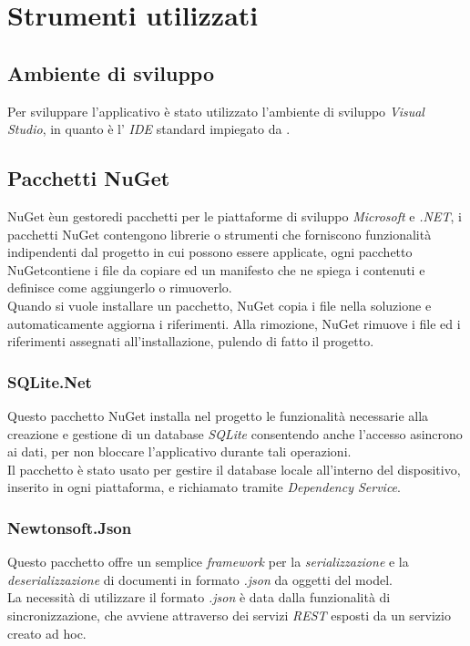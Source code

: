 \section{Strumenti utilizzati}
\subsection{Ambiente di sviluppo}
Per sviluppare l'applicativo è stato utilizzato l'ambiente di sviluppo \textit{Visual Studio}, in quanto è l' \textit{IDE} standard impiegato da \asi.

\subsection{Pacchetti NuGet}
NuGet èun gestoredi pacchetti per le piattaforme di sviluppo \textit{Microsoft} e \textit{.NET}, i pacchetti NuGet contengono librerie o strumenti che forniscono funzionalità indipendenti dal progetto in cui possono essere applicate, ogni pacchetto NuGetcontiene i file da copiare ed un manifesto che ne spiega i contenuti e definisce come aggiungerlo o rimuoverlo.
\\
Quando si vuole installare un pacchetto, NuGet copia i file nella soluzione e automaticamente aggiorna i riferimenti. Alla rimozione, NuGet rimuove i file ed i riferimenti assegnati all'installazione, pulendo di fatto il progetto.

\subsubsection{SQLite.Net}
Questo pacchetto NuGet installa nel progetto le funzionalità necessarie alla creazione e gestione di un database \textit{SQLite} consentendo anche l'accesso asincrono ai dati, per non bloccare l'applicativo durante tali operazioni.
\\
Il pacchetto è stato usato per gestire il database locale all'interno del dispositivo, inserito in ogni piattaforma, e richiamato tramite \textit{Dependency Service}.

\subsubsection{Newtonsoft.Json}
Questo pacchetto offre un semplice \textit{framework} per la \textit{serializzazione} e la \textit{deserializzazione} di documenti in formato \textit{.json} da oggetti del model.
\\
La necessità di utilizzare il formato \textit{.json} è data dalla funzionalità di sincronizzazione, che avviene attraverso dei servizi \textit{REST} esposti da un servizio creato ad hoc.


